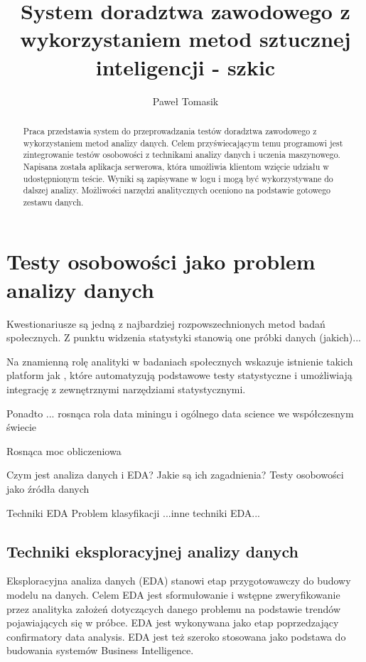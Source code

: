 \documentclass[12pt,a4paper,oneside]{report} %
\title{System doradztwa zawodowego z wykorzystaniem metod sztucznej inteligencji - szkic}
\author{Paweł Tomasik}
\begin{document}
\maketitle
\renewcommand{\abstractname}{Strzeszczenie}
\begin{abstract}
Praca przedstawia system do przeprowadzania testów doradztwa zawodowego z wykorzystaniem metod analizy danych. Celem przyświecającym temu programowi jest zintegrowanie testów osobowości z technikami analizy danych i uczenia maszynowego. Napisana została aplikacja serwerowa, która umożliwia klientom wzięcie udziału w udostępnionym teście. Wyniki są zapisywane w logu i mogą być wykorzystywane do dalszej analizy. Możliwości narzędzi analitycznych oceniono na podstawie gotowego zestawu danych.
\end{abstract}

\tableofcontents






\chapter{Testy osobowości jako problem analizy danych}

Kwestionariusze są jedną z najbardziej rozpowszechnionych metod badań społecznych. Z punktu widzenia statystyki stanowią one próbki danych (jakich)...

Na znamienną rolę analityki w badaniach społecznych wskazuje istnienie takich platform jak \cite{surveymonkey}, które automatyzują podstawowe testy statystyczne i umożliwiają integrację z zewnętrznymi narzędziami statystycznymi.

Ponadto ... rosnąca rola data miningu i ogólnego data science we współczesnym świecie

Rosnąca moc obliczeniowa



Czym jest analiza danych i EDA?
Jakie są ich zagadnienia?
Testy osobowości jako źródła danych

Techniki EDA
Problem klasyfikacji
...inne techniki EDA...


\section{Techniki eksploracyjnej analizy danych}

Eksploracyjna analiza danych (EDA) stanowi etap przygotowawczy do budowy modelu na danych. Celem EDA jest sformułowanie i wstępne zweryfikowanie przez analityka założeń dotyczących danego problemu na podstawie trendów pojawiających się w próbce. EDA jest wykonywana jako etap poprzedzający confirmatory data analysis. EDA jest też szeroko stosowana jako podstawa do budowania systemów Business Intelligence.
\end{document}
